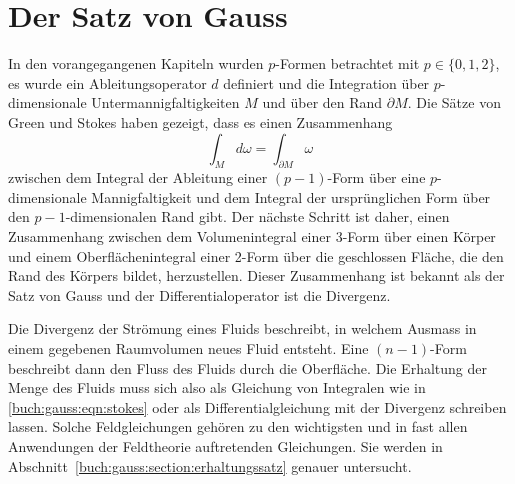 %
%
%
\chapter{Der Satz von Gauss
\label{chapter:gauss}}

\noindent
In den vorangegangenen Kapiteln wurden $p$-Formen betrachtet mit
$p\in\{0,1,2\}$, es wurde ein Ableitungsoperator $d$ definiert
und die Integration über $p$-dimensionale Untermannigfaltigkeiten $M$
und über den Rand $\partial M$.
Die Sätze von Green und Stokes haben gezeigt, dass es einen Zusammenhang
\begin{equation}
\int_M d\omega = \int_{\partial M} \omega
\label{buch:gauss:eqn:stokes}
\end{equation}
zwischen dem Integral der Ableitung einer $(p-1)$-Form über eine
$p$-dimensionale Mannigfaltigkeit und dem Integral der ursprünglichen
Form über den $p-1$-dimensionalen Rand gibt.
Der nächste Schritt ist daher, einen Zusammenhang zwischen dem Volumenintegral
einer 3-Form über einen Körper und einem Oberflächenintegral
einer 2-Form über die geschlossen Fläche, die den Rand des Körpers bildet,
herzustellen.
Dieser Zusammenhang ist bekannt als der Satz von Gauss und der
Differentialoperator ist die Divergenz.

Die Divergenz der Strömung eines Fluids beschreibt, in welchem Ausmass
in einem gegebenen Raumvolumen neues Fluid entsteht.
Eine $(n-1)$-Form beschreibt dann den Fluss des Fluids durch die Oberfläche.
Die Erhaltung der Menge des Fluids muss sich also als Gleichung
von Integralen wie in \eqref{buch:gauss:eqn:stokes} oder als
Differentialgleichung mit der Divergenz schreiben lassen.
Solche Feldgleichungen gehören zu den wichtigsten und in fast allen
Anwendungen der Feldtheorie auftretenden Gleichungen.
Sie werden in Abschnitt~\ref{buch:gauss:section:erhaltungssatz}
genauer untersucht.





